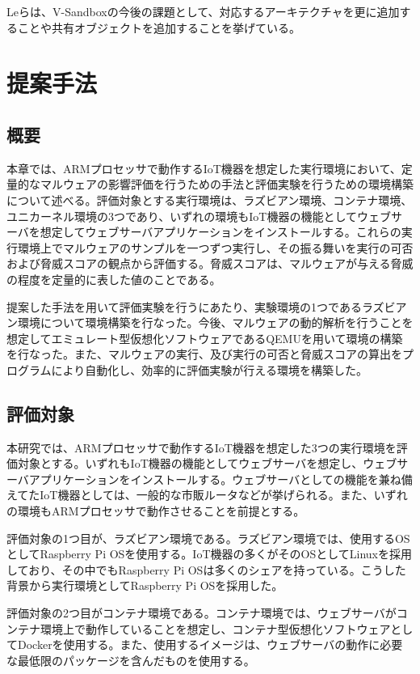 \documentclass[12pt,a4paper,titlepage,report]{jsbook}
\begin{document}
Leらは、V-Sandboxの今後の課題として、対応するアーキテクチャを更に追加することや共有オブジェクトを追加することを挙げている。




\chapter{提案手法}
\section{概要}
本章では、ARMプロセッサで動作するIoT機器を想定した実行環境において、定量的なマルウェアの影響評価を行うための手法と評価実験を行うための環境構築について述べる。評価対象とする実行環境は、ラズビアン環境、コンテナ環境、ユニカーネル環境の3つであり、いずれの環境もIoT機器の機能としてウェブサーバを想定してウェブサーバアプリケーションをインストールする。これらの実行環境上でマルウェアのサンプルを一つずつ実行し、その振る舞いを実行の可否および脅威スコアの観点から評価する。脅威スコアは、マルウェアが与える脅威の程度を定量的に表した値のことである。

提案した手法を用いて評価実験を行うにあたり、実験環境の1つであるラズビアン環境について環境構築を行なった。今後、マルウェアの動的解析を行うことを想定してエミュレート型仮想化ソフトウェアであるQEMUを用いて環境の構築を行なった。また、マルウェアの実行、及び実行の可否と脅威スコアの算出をプログラムにより自動化し、効率的に評価実験が行える環境を構築した。

\section{評価対象}
本研究では、ARMプロセッサで動作するIoT機器を想定した3つの実行環境を評価対象とする。いずれもIoT機器の機能としてウェブサーバを想定し、ウェブサーバアプリケーションをインストールする。ウェブサーバとしての機能を兼ね備えてたIoT機器としては、一般的な市販ルータなどが挙げられる。また、いずれの環境もARMプロセッサで動作させることを前提とする。

評価対象の1つ目が、ラズビアン環境である。ラズビアン環境では、使用するOSとしてRaspberry Pi OSを使用する。IoT機器の多くがそのOSとしてLinuxを採用しており、その中でもRaspberry Pi OSは多くのシェアを持っている\cite{malwaresurvey}。こうした背景から実行環境としてRaspberry Pi OSを採用した。

評価対象の2つ目がコンテナ環境である。コンテナ環境では、ウェブサーバがコンテナ環境上で動作していることを想定し、コンテナ型仮想化ソフトウェアとしてDockerを使用する。また、使用するイメージは、ウェブサーバの動作に必要な最低限のパッケージを含んだものを使用する。
\end{document}
